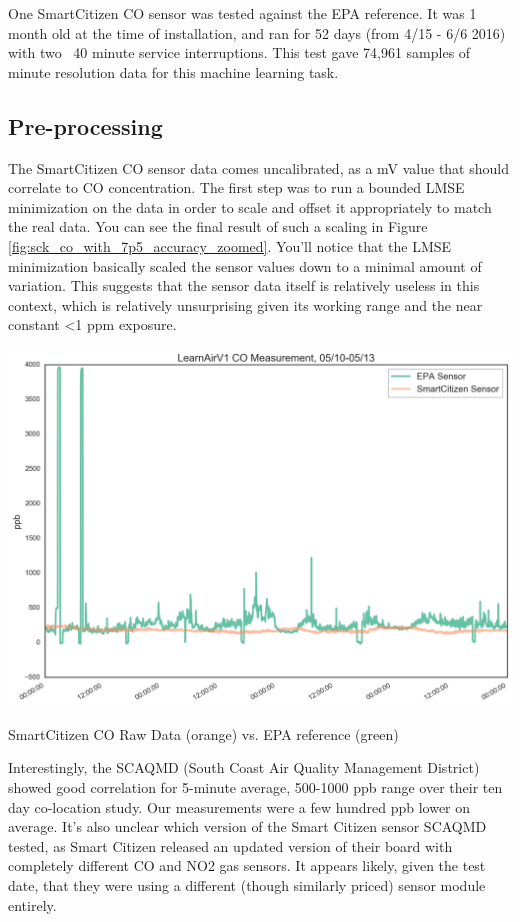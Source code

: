 One SmartCitizen CO sensor was tested against the EPA reference.  It was 1 month old at the time of installation, and ran for 52 days (from 4/15 - 6/6 2016) with two ~40 minute service interruptions.  This test gave 74,961 samples of minute resolution data for this machine learning task.


\subsection{Pre-processing}

The SmartCitizen CO sensor data comes uncalibrated, as a mV value that should correlate to CO concentration.  The first step was to run a bounded LMSE minimization on the data in order to scale and offset it appropriately to match the real data.  You can see the final result of such a scaling in Figure \ref{fig:sck_co_with_7p5_accuracy_zoomed}.  You'll notice that the LMSE minimization basically scaled the sensor values down to a minimal amount of variation.  This suggests that the sensor data itself is relatively useless in this context, which is relatively unsurprising given its working range and the near constant <1 ppm exposure.  

\begin{marginfigure}
 	\includegraphics[width=\textwidth]{figs/co_sck_zoomed}               
 	 \caption{SmartCitizen CO Raw Data (orange) vs. EPA reference (green)}
  	\label{fig:sck_co_raw_zoomed}
\end{marginfigure}

Interestingly, the SCAQMD (South Coast Air Quality Management District) showed good correlation for 5-minute average, 500-1000 ppb range over their ten day co-location study.  Our measurements were a few hundred ppb lower on average.  It's also unclear which version of the Smart Citizen sensor SCAQMD tested, as Smart Citizen released an updated version of their board with completely different CO and NO2 gas sensors.  It appears likely, given the test date, that they were using a different (though similarly priced) sensor module entirely.


